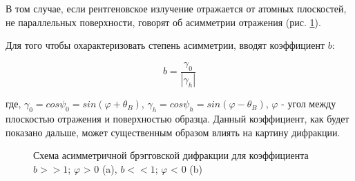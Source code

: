 В том случае, если рентгеновское излучение отражается от атомных плоскостей, не
 параллельных поверхности, говорят об асимметрии отражения (рис. \ref{ris:assymetric_brag}).

Для того чтобы охарактеризовать степень асимметрии, вводят коэффициент $b$:

\begin{equation}
  b = \frac {\gamma_0}{|\gamma_h|}
  \label{eq:koef_b}
 \end{equation}

\noindent
где, $\gamma_0 = cos \psi_0 = sin ( \varphi + \theta_B)$, $\gamma_h = cos \psi_h = sin ( \varphi - \theta_B)$,
$\varphi$ - угол между плоскостью отражения и поверхностью образца. Данный коэффициент, как будет показано дальше,
может существенным образом влиять на картину дифракции.

\begin{figure}[H]
  \centering
  \hfill
  \caption{Схема асимметричной брэгговской дифракции для коэффициента  $b >> 1$; $\varphi$ > 0 (a),
   $b << 1$; $\varphi$ < 0 (b)}
  \label{ris:assymetric_brag}
\end{figure}
